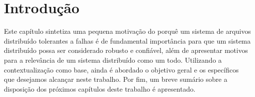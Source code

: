 \chapter{Introdução}

Este capítulo sintetiza uma pequena motivação do porquê um sistema de arquivos distribuído tolerantes a falhas é de fundamental importância para que um sistema distribuído possa ser considerado robusto e confiável, além de apresentar motivos para a relevância de um sistema distribuído como um todo. Utilizando a contextualização como base, ainda é abordado o objetivo geral e os específicos que desejamos alcançar neste trabalho. Por fim, um breve sumário sobre a disposição dos próximos capítulos deste trabalho é apresentado.
\\

 

	

